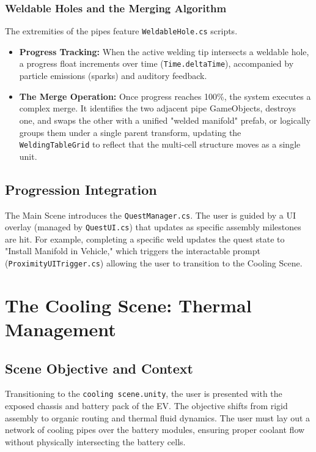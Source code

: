 \documentclass[12pt,a4paper,oneside]{report}
\begin{document}
\subsection{Weldable Holes and the Merging Algorithm}
The extremities of the pipes feature \texttt{WeldableHole.cs} scripts. 
\begin{itemize}
    \item \textbf{Progress Tracking:} When the active welding tip intersects a weldable hole, a progress float increments over time (\texttt{Time.deltaTime}), accompanied by particle emissions (sparks) and auditory feedback.
    \item \textbf{The Merge Operation:} Once progress reaches 100\%, the system executes a complex merge. It identifies the two adjacent pipe GameObjects, destroys one, and swaps the other with a unified "welded manifold" prefab, or logically groups them under a single parent transform, updating the \texttt{WeldingTableGrid} to reflect that the multi-cell structure moves as a single unit.
\end{itemize}

\section{Progression Integration}
The Main Scene introduces the \texttt{QuestManager.cs}. The user is guided by a UI overlay (managed by \texttt{QuestUI.cs}) that updates as specific assembly milestones are hit. For example, completing a specific weld updates the quest state to "Install Manifold in Vehicle," which triggers the interactable prompt (\texttt{ProximityUITrigger.cs}) allowing the user to transition to the Cooling Scene.

\chapter{The Cooling Scene: Thermal Management}

\section{Scene Objective and Context}
Transitioning to the \texttt{cooling scene.unity}, the user is presented with the exposed chassis and battery pack of the EV. The objective shifts from rigid assembly to organic routing and thermal fluid dynamics. The user must lay out a network of cooling pipes over the battery modules, ensuring proper coolant flow without physically intersecting the battery cells.
\end{document}
